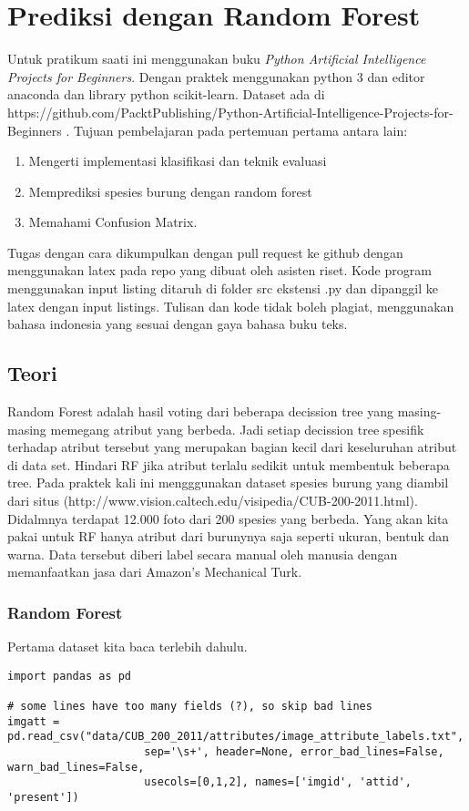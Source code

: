 \chapter{Prediksi dengan Random Forest}

Untuk pratikum saati ini menggunakan buku \textit{Python Artificial Intelligence Projects for Beginners}\cite{eckroth2018python}. Dengan praktek menggunakan python 3 dan editor anaconda dan library python scikit-learn.
Dataset ada di https://github.com/PacktPublishing/Python-Artificial-Intelligence-Projects-for-Beginners .
Tujuan pembelajaran pada pertemuan pertama antara lain:
\begin{enumerate}
\item
Mengerti implementasi klasifikasi dan teknik evaluasi
\item
Memprediksi spesies burung dengan random forest
\item
Memahami Confusion Matrix.
\end{enumerate}
Tugas dengan cara dikumpulkan dengan pull request ke github dengan menggunakan latex pada repo yang dibuat oleh asisten riset. Kode program menggunakan input listing ditaruh di folder src ekstensi .py dan dipanggil ke latex dengan input listings. Tulisan dan kode tidak boleh plagiat, menggunakan bahasa indonesia yang sesuai dengan gaya bahasa buku teks.

\section{Teori}
Random Forest adalah hasil voting dari beberapa decission tree yang masing-masing memegang atribut yang berbeda. Jadi setiap decission tree spesifik terhadap atribut tersebut yang merupakan bagian kecil dari keseluruhan atribut di data set. Hindari RF jika atribut terlalu sedikit untuk membentuk beberapa tree. Pada praktek kali ini mengggunakan dataset spesies burung yang diambil dari situs (http://www.vision.caltech.edu/visipedia/CUB-200-2011.html). Didalmnya terdapat 12.000 foto dari 200 spesies yang berbeda. Yang akan kita pakai untuk RF hanya atribut dari burunynya saja seperti ukuran, bentuk dan warna. Data tersebut diberi label secara manual oleh manusia dengan memanfaatkan jasa dari Amazon's Mechanical Turk.

\subsection{Random Forest}
Pertama dataset kita baca terlebih dahulu.
\begin{lstlisting}[caption=Fungsi Sederhana,label={lst:fungsisederhana}]
import pandas as pd

# some lines have too many fields (?), so skip bad lines
imgatt = pd.read_csv("data/CUB_200_2011/attributes/image_attribute_labels.txt",
                     sep='\s+', header=None, error_bad_lines=False, warn_bad_lines=False,
                     usecols=[0,1,2], names=['imgid', 'attid', 'present'])

\end{lstlisting}

